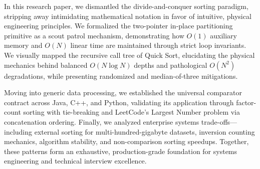 \documentclass[10pt,journal,compsoc,onecolumn]{IEEEtran}
\begin{document}
In this research paper, we dismantled the divide-and-conquer sorting paradigm, stripping away intimidating mathematical notation in favor of intuitive, physical engineering principles. We formalized the two-pointer in-place partitioning primitive as a scout patrol mechanism, demonstrating how $O(1)$ auxiliary memory and $O(N)$ linear time are maintained through strict loop invariants. We visually mapped the recursive call tree of Quick Sort, elucidating the physical mechanics behind balanced $O(N \log N)$ depths and pathological $O(N^2)$ degradations, while presenting randomized and median-of-three mitigations.

Moving into generic data processing, we established the universal comparator contract across Java, C++, and Python, validating its application through factor-count sorting with tie-breaking and LeetCode's Largest Number problem via concatenation ordering. Finally, we analyzed enterprise systems trade-offs—including external sorting for multi-hundred-gigabyte datasets, inversion counting mechanics, algorithm stability, and non-comparison sorting speedups. Together, these patterns form an exhaustive, production-grade foundation for systems engineering and technical interview excellence.
\end{document}
